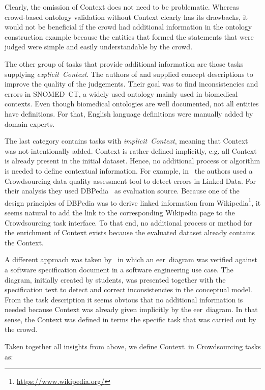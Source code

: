 Clearly, the omission of Context does not need to be problematic. Whereas crowd-based ontology validation without Context clearly has its drawbacks, it would not be beneficial if the crowd had additional information in the ontology construction example because the entities that formed the statements that were judged were simple and easily understandable by the crowd. 

The other group of tasks that provide additional information are those tasks supplying \emph{explicit~Context}. The authors of \cite{mortensen2015} and \cite{mortensen2016} supplied concept descriptions to improve the quality of the judgements. Their goal was to find inconsistencies and errors in SNOMED~CT, a widely used ontology mainly used in biomedical contexts. Even though biomedical ontologies are well documented, not all entities have definitions. For that, English language definitions were manually added by domain experts. 

The last category contains tasks with \emph{implicit~Context}, meaning that Context was not intentionally added. Context is rather defined implicitly, e.g. all Context is already present in the initial dataset. Hence, no additional process or algorithm is needed to define contextual information. For example, in~\cite{acosta2018} the authors used a Crowdsourcing data quality assessment tool to detect errors in Linked Data. 
For their analysis they used DBPedia~\cite{auer2007} as evaluation source. Because one of the design principles of DBPedia was to derive linked information from Wikipedia\footnote{\url{https://www.wikipedia.org/}}, it seems natural to add the link to the corresponding Wikipedia page to the Crowdsourcing task interface. To that end, no additional process or method for the enrichment of Context exists because the evaluated dataset already contains the Context.

A different approach was taken by~\cite{sabou2018, winkler2017, winkler2017_2} in which an \gls{eer}~diagram was verified against a software specification document in a software engineering use case. The diagram, initially created by students, was presented together with the specification text to detect and correct inconsistencies in the conceptual model. From the task description it seems obvious that no additional information is needed because Context was already given implicitly by the \gls{eer}~diagram. In that sense, the Context was defined in terms the specific task that was carried out by the crowd. 

Taken together all insights from above, we define \guillemotright Context\guillemotleft~in Crowdsourcing tasks as:

